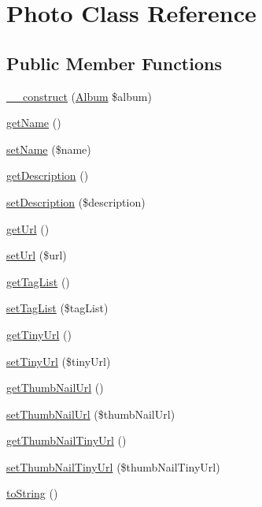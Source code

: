 \hypertarget{class_photo}{\section{Photo Class Reference}
\label{class_photo}
}
\subsection*{Public Member Functions}
\begin{DoxyCompactItemize}
\item 
\hyperlink{class_photo_aee869b6225ef4a3fd334327d3bd39f29}{\+\_\+\+\_\+construct} (\hyperlink{class_album}{Album} \$album)
\item 
\hyperlink{class_photo_a3d0963e68bb313b163a73f2803c64600}{get\+Name} ()
\item 
\hyperlink{class_photo_a2fe666694997d047711d7653eca2f132}{set\+Name} (\$name)
\item 
\hyperlink{class_photo_a2e7bb35c71bf1824456ceb944cb7a845}{get\+Description} ()
\item 
\hyperlink{class_photo_a31fad3e39336ea079ea758e051866627}{set\+Description} (\$description)
\item 
\hyperlink{class_photo_accd14bda49a1044b4d8dd93f020f11ee}{get\+Url} ()
\item 
\hyperlink{class_photo_a0b6d0c531aa70b1811b166299edab8d0}{set\+Url} (\$url)
\item 
\hyperlink{class_photo_aa0b3c076d9833856e1a293d2abe3c2e7}{get\+Tag\+List} ()
\item 
\hyperlink{class_photo_abb83503770b12bea712095e0363cb3db}{set\+Tag\+List} (\$tag\+List)
\item 
\hyperlink{class_photo_a091447bbcaa0d446868dad1498b44c01}{get\+Tiny\+Url} ()
\item 
\hyperlink{class_photo_aa324ef58c503db9ab7a00323b15f3d91}{set\+Tiny\+Url} (\$tiny\+Url)
\item 
\hyperlink{class_photo_a9d578600a01ae355a813fd6e6ee96878}{get\+Thumb\+Nail\+Url} ()
\item 
\hyperlink{class_photo_a5dd522dd00f0d15e28453b3818b1e180}{set\+Thumb\+Nail\+Url} (\$thumb\+Nail\+Url)
\item 
\hyperlink{class_photo_a90d93ef21bb68ca5db35f0642b146aa5}{get\+Thumb\+Nail\+Tiny\+Url} ()
\item 
\hyperlink{class_photo_a8574f19f8226154ba90f81519378c4ba}{set\+Thumb\+Nail\+Tiny\+Url} (\$thumb\+Nail\+Tiny\+Url)
\item 
\hyperlink{class_photo_a5558c5d549f41597377fa1ea8a1cefa3}{to\+String} ()
\end{DoxyCompactItemize}
